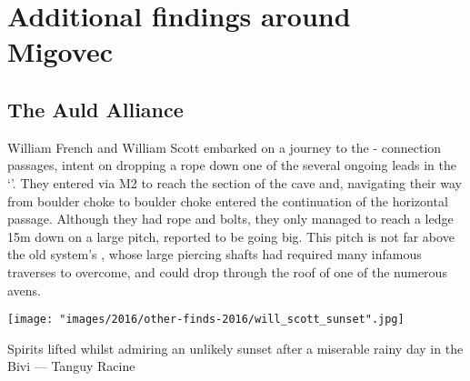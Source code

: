 \section{Additional findings around Migovec}

\subsection{The Auld Alliance}
William French and William Scott embarked on a journey to the - connection passages, intent on dropping a rope down one of the several ongoing leads in the `'. They entered via M2 to reach the  section of the cave and, navigating their way from boulder choke to boulder choke entered the continuation of the horizontal passage. Although they had rope and bolts, they only managed to reach a ledge 15m down on a large pitch, reported to be going big. This pitch is not far above the old system's , whose large piercing shafts had required many infamous traverses to overcome, and could drop through the roof of one of the numerous avens.

\begin{marginfigure}
\checkoddpage \ifoddpage \forcerectofloat \else \forceversofloat \fi
\centering
 \texttt{[image: "images/2016/other-finds-2016/will\_scott\_sunset".jpg]} 
 \caption{Spirits lifted whilst admiring an unlikely sunset after a miserable rainy day in the Bivi --- Tanguy Racine}
 \label{Sunset}
\end{marginfigure}



